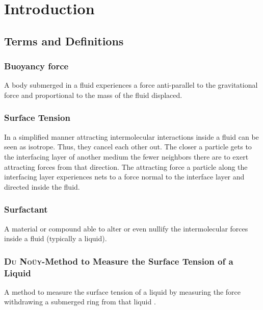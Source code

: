 \chapter{Introduction}
    \section{Terms and Definitions}
        \subsection*{Buoyancy force}\label{sec:Buoyancy force}
            A body submerged in a fluid experiences a force anti-parallel to the gravitational force and proportional to the
            mass of the fluid displaced.
        \subsection*{Surface Tension}
            In a simplified manner attracting intermolecular interactions inside a fluid can be seen as isotrope. Thus,
            they cancel each other out. The closer a particle gets to the interfacing layer of another medium the fewer neighbors
            there are to exert attracting forces from that direction. The attracting force a particle along the interfacing
            layer experiences nets to a force normal to the interface layer and directed inside the fluid.
        \subsection*{Surfactant}
            A material or compound able to alter or even nullify the intermolecular forces inside a fluid (typically a liquid).
        \subsection*{\textsc{Du Noüy}-Method to Measure the Surface Tension of a Liquid}
            A method to measure the surface tension of a liquid by measuring the force withdrawing a submerged ring from that
            liquid \cite{ring.method.DuNouy.1919}.
